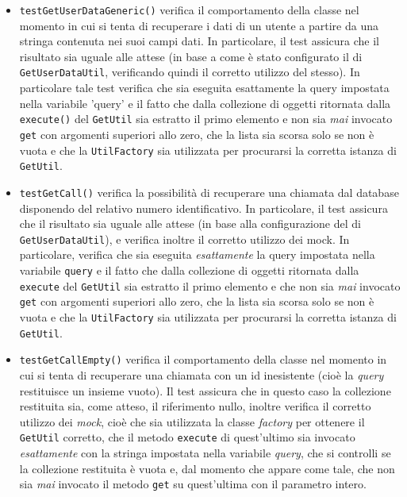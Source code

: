 \begin{itemize}
\begin{itemize}
\item \texttt{testGetUserDataGeneric()} verifica il comportamento della classe nel momento in cui si tenta di recuperare i dati di un utente a partire da una stringa contenuta nei suoi campi dati. In particolare, il test assicura che il risultato sia uguale alle attese (in base a come è stato configurato il  di \texttt{GetUserDataUtil}, verificando quindi il corretto utilizzo del  stesso). In particolare tale test verifica che sia eseguita esattamente la query impostata nella variabile 'query' e il fatto che dalla collezione di oggetti ritornata dalla \texttt{execute()} del \texttt{GetUtil} sia estratto il primo elemento e non sia \textit{mai} invocato \texttt{get} con argomenti superiori allo zero, che la lista sia scorsa solo se non è vuota e che la \texttt{UtilFactory} sia utilizzata per procurarsi la corretta istanza di \texttt{GetUtil}.

\item \texttt{testGetCall()} verifica la possibilità di recuperare una chiamata dal database disponendo del relativo numero identificativo. In particolare, il test assicura che il risultato sia uguale alle attese (in base alla configurazione del  di \texttt{GetUserDataUtil}), e verifica inoltre il corretto utilizzo dei mock. In particolare, verifica che sia eseguita \textit{esattamente} la query impostata nella variabile \texttt{query} e il fatto che dalla collezione di oggetti ritornata dalla \texttt{execute} del \texttt{GetUtil} sia estratto il primo elemento e che non sia \textit{mai} invocato \texttt{get} con argomenti superiori allo zero, che la lista sia scorsa solo se non è vuota e che la \texttt{UtilFactory} sia utilizzata per procurarsi la corretta istanza di \texttt{GetUtil}.

\item \texttt{testGetCallEmpty()} verifica il comportamento della classe nel momento in cui si tenta di recuperare una chiamata con un id inesistente (cioè la \textit{query} restituisce un insieme vuoto).
Il test assicura che in questo caso la collezione restituita sia, come atteso, il riferimento nullo, inoltre verifica il corretto utilizzo dei \textit{mock}, cioè che sia utilizzata la classe \textit{factory} per ottenere il \texttt{GetUtil} corretto, che il metodo \texttt{execute} di quest'ultimo sia invocato \textit{esattamente} con la stringa impostata nella variabile \textit{query}, che si controlli se la collezione restituita è vuota e, dal momento che appare come tale, che non sia \textit{mai} invocato il metodo \texttt{get} su quest'ultima con il parametro intero.


\end{itemize}
\end{itemize}
